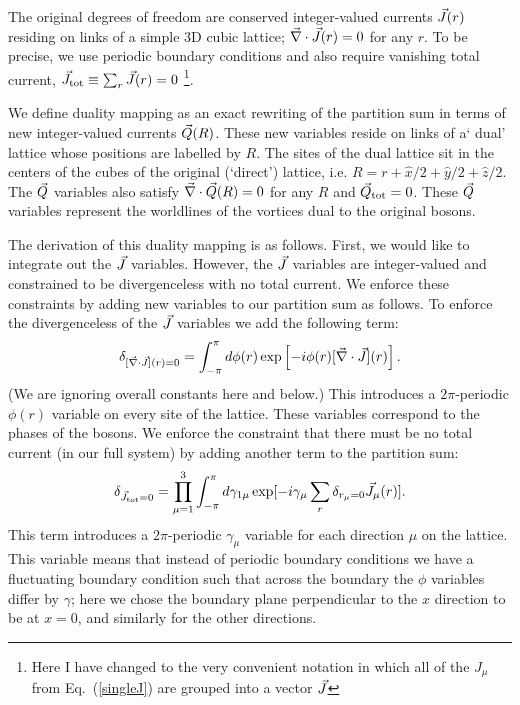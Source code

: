  The original degrees of freedom are conserved integer-valued currents $\vec{J}(r)$ residing on links of a simple 3D cubic lattice; $\vec{\nabla} \cdot \vec{J}(r) = 0$ for any $r$.  To be precise, we use periodic boundary conditions and also require vanishing total current, $\vec{J}_{\rm tot} \equiv \sum_r \vec{J}(r) = 0$
\footnote{Here I have changed to the very convenient notation in which all of the $J_\mu$ from Eq.~(\ref{singleJ}) are grouped into a vector $\vec{J}$}.  

We define duality mapping as an exact rewriting of the partition sum in terms of new integer-valued currents $\vec{Q}(R)$. These new variables  reside on links of a` dual' lattice whose positions are labelled by $R$. The sites of the dual lattice sit in the centers of the cubes of the original (`direct') lattice, i.e. $R=r+\hat{x}/2+\hat{y}/2+\hat{z}/2$.
The $\vec{Q}$ variables also satisfy $\vec{\nabla} \cdot \vec{Q}(R) = 0$ for any $R$ and $\vec{Q}_{\rm tot} = 0$. These $\vec{Q}$ variables represent the worldlines of the vortices dual to the original bosons. 

The derivation of this duality mapping is as follows.  
 First, we would like to integrate out the $\vec{J}$ variables. However, the $\vec{J}$ variables are integer-valued and constrained to be divergenceless with no total current. We enforce these constraints by adding new variables to our partition sum as follows.
To enforce the divergenceless of the $\vec{J}$ variables we add the following term:
\begin{equation}
\delta_{[\vec{\nabla}\cdot\vec{J}](r)=0}=\int_{-\pi}^{\pi} d\phi(r) \exp\left[-i\phi(r)[\vec{\nabla}\cdot\vec{J}](r)\right].
\label{zphi}
\end{equation}
(We are ignoring overall constants here and below.) This introduces a $2\pi$-periodic $\phi(r)$ variable on every site of the lattice. These variables correspond to the phases of the bosons. We enforce the constraint that there must be no total current (in our full system) by adding another term to the partition sum:
\begin{eqnarray}
\delta_{\vec{J}_{{\rm tot}}=0}=\prod_{\mu=1}^{3}\int_{-\pi}^{\pi} d\gamma_{1\mu} \exp[-i\gamma_{\mu}\sum_r \delta_{r_\mu=0}\vec{J}_{\mu}(r)].
\label{zgamma}
\end{eqnarray}
This term introduces a $2\pi$-periodic $\gamma_{\mu}$ variable for each direction $\mu$ on the lattice. This variable means that instead of periodic boundary conditions we have a fluctuating boundary condition such that across the boundary the $\phi$ variables differ by $\gamma$; here we chose the boundary plane perpendicular to the $x$ direction to be at $x=0$, and similarly for the other directions.
 
